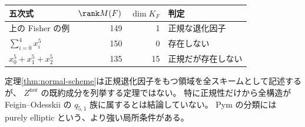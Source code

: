 \begin{center}
\begin{tabular}{lrrl}
\toprule
五次式 & $\rank M(F)$ & $\dim K_F$ & 判定\\
\midrule
上の Fisher の例 &149&1& 正規な退化因子\\
$\sum_{i=0}^4x_i^5$ &150&0& 存在しない\\
$x_0^5+x_1^5+x_2^5$ &135&15& 正規だが存在しない\\
\bottomrule
\end{tabular}
\end{center}

\begin{remark}[この節で残る分類問題]
定理\ref{thm:normal-scheme}は正規退化因子をもつ領域を全スキームとして記述するが、
$Z^{\mathrm{nor}}$ の既約成分を列挙する定理ではない。
特に正規性だけから全構造が Feigin--Odesskii の $q_{5,1}$ 族に属するとは結論していない。
Pym \cite[Theorem 1.3]{PymElliptic} の分類には purely elliptic という、より強い局所条件がある。
\end{remark}
